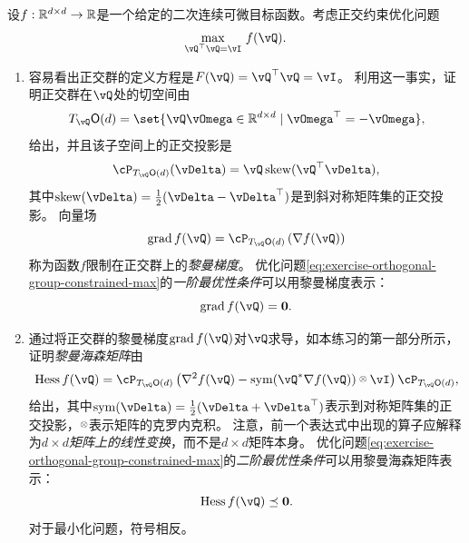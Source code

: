 \documentclass[../../book-main.tex]{subfiles}
\begin{document}
设$f : \mathbb{R}^{d\times d} \to \mathbb{R}$是一个给定的二次连续可微目标函数。考虑正交约束优化问题
\begin{equation}\label{eq:exercise-orthogonal-group-constrained-max}
    \max_{\vQ^\top \vQ = \vI}\, f(\vQ). 
\end{equation}
\begin{enumerate}
    \item 容易看出正交群的定义方程是$F(\vQ) = \vQ^\top \vQ = \vI$。
    利用这一事实，证明正交群在$\vQ$处的切空间由
    \begin{equation*}
        T_{\vQ} \O(d) = \set{\vQ \vOmega \in \R^{d\times d} \given \vOmega^\top = - \vOmega},
    \end{equation*}
    给出，并且该子空间上的正交投影是
    \begin{equation*}
    \cP_{T_{\vQ}\O(d)}(\vDelta) =  \vQ \Skew(\vQ^\top \vDelta),
    \end{equation*}
    其中$\Skew(\vDelta) = \tfrac{1}{2} ( \vDelta - \vDelta^\top)$是到斜对称矩阵集的正交投影。
    向量场
    \begin{equation}\label{eq:exercise-riemann-grad-orthogonal-group}
    \mathrm{grad}\, f(\vQ) = \cP_{T_{\vQ} \O(d)} \left( \nabla f(\vQ) \right)
    \end{equation}
    称为函数$f$限制在正交群上的\textit{黎曼梯度}。
    优化问题\eqref{eq:exercise-orthogonal-group-constrained-max}的\textit{一阶最优性条件}可以用黎曼梯度表示：
    \begin{equation*}
        \mathrm{grad}\, f(\vQ) = \mathbf{0}.
    \end{equation*}
    \item 通过将正交群的黎曼梯度$\mathrm{grad}\, f(\vQ)$对$\vQ$求导，如本练习的第一部分所示，证明\textit{黎曼海森矩阵}由
    \begin{equation}\label{eq:exercise-riemann-hess-orthogonal-group}
        \mathrm{Hess}\, f(\vQ) = \cP_{T_{\vQ}\O(d)} \left( 
        \nabla^2 f(\vQ) - \Symm(\vQ\adj \nabla f(\vQ)) \kron \vI
        \right) \cP_{T_{\vQ}\O(d)},
    \end{equation}
    给出，其中$\Symm(\vDelta) = \tfrac{1}{2}(\vDelta + \vDelta^\top)$表示到对称矩阵集的正交投影，$\kron$表示矩阵的克罗内克积。
    注意，前一个表达式中出现的算子应解释为\textit{${d \times d}$矩阵上的线性变换}，而不是$d \times d$矩阵本身。
    优化问题\eqref{eq:exercise-orthogonal-group-constrained-max}的\textit{二阶最优性条件}可以用黎曼海森矩阵表示：
    \begin{equation*}
        \mathrm{Hess}\, f(\vQ) \preceq \mathbf{0}.
    \end{equation*}
    对于最小化问题，符号相反。
\end{enumerate}
\end{document}
